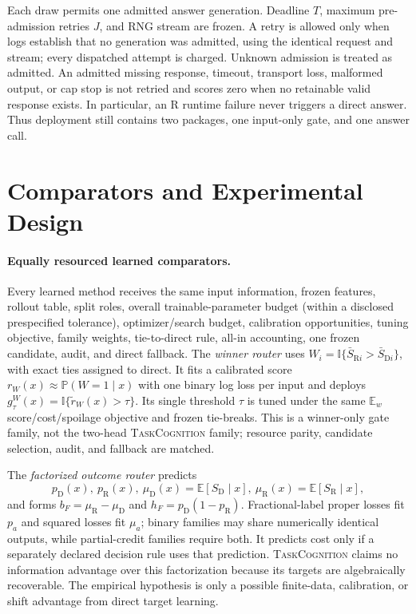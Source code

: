 \documentclass{article}
\newcommand{\TC}{\textsc{TaskCognition}}
\newcommand{\D}{\ensuremath{\mathrm{D}}}
\newcommand{\Rpol}{\ensuremath{\mathrm{R}}}
\newcommand{\1}{\mathbb{I}}
\newcommand{\E}{\mathbb{E}}
\newcommand{\Ew}{\mathbb{E}_{w}}
\newcommand{\Prb}{\mathbb{P}}
\begin{document}
Each draw permits one admitted answer generation. Deadline $T$, maximum pre-admission retries $J$, and RNG stream are frozen. A retry is allowed only when logs establish that no generation was admitted, using the identical request and stream; every dispatched attempt is charged. Unknown admission is treated as admitted. An admitted missing response, timeout, transport loss, malformed output, or cap stop is not retried and scores zero when no retainable valid response exists. In particular, an \Rpol{} runtime failure never triggers a direct answer. Thus deployment still contains two packages, one input-only gate, and one answer call.

\section{Comparators and Experimental Design}
\paragraph{Equally resourced learned comparators.}
Every learned method receives the same input information, frozen features, rollout table, split roles, overall trainable-parameter budget (within a disclosed prespecified tolerance), optimizer/search budget, calibration opportunities, tuning objective, family weights, tie-to-direct rule, all-in accounting, one frozen candidate, audit, and direct fallback. The \emph{winner router} uses $W_i=\1\{\bar S_{\Rpol i}>\bar S_{\D i}\}$, with exact ties assigned to direct. It fits a calibrated score $r_W(x)\approx\Prb(W=1\mid x)$ with one binary log loss per input and deploys $g^W_\tau(x)=\1\{\widetilde r_W(x)>\tau\}$. Its single threshold $\tau$ is tuned under the same $\Ew$ score/cost/spoilage objective and frozen tie-breaks. This is a winner-only gate family, not the two-head \TC{} family; resource parity, candidate selection, audit, and fallback are matched.

The \emph{factorized outcome router} predicts
\begin{equation}
 p_\D(x),\ p_\Rpol(x),\ \mu_\D(x)=\E[S_\D\mid x],\ \mu_\Rpol(x)=\E[S_\Rpol\mid x],
 \label{eq:factorized}
\end{equation}
and forms $b_F=\mu_\Rpol-\mu_\D$ and $h_F=p_\D(1-p_\Rpol)$. Fractional-label proper losses fit $p_a$ and squared losses fit $\mu_a$; binary families may share numerically identical outputs, while partial-credit families require both. It predicts cost only if a separately declared decision rule uses that prediction. \TC{} claims no information advantage over this factorization because its targets are algebraically recoverable. The empirical hypothesis is only a possible finite-data, calibration, or shift advantage from direct target learning.
\end{document}
